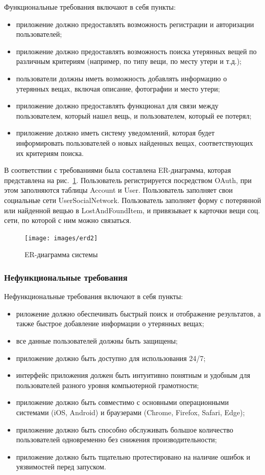 Функциональные требования включают в себя пункты:

\begin{itemize}[wide=0pt]
	\item приложение должно предоставлять возможность регистрации и авторизации пользователей;
	\item приложение должно предоставлять возможность поиска утерянных вещей по различным критериям (например, по типу вещи, по месту утери и т.д.);
	\item пользователи должны иметь возможность добавлять информацию о утерянных вещах, включая описание, фотографии и место утери;
	\item приложение должно предоставлять функционал для связи между пользователем, который нашел вещь, и пользователем, который ее потерял;
	\item приложение должно иметь систему уведомлений, которая будет информировать пользователей о новых найденных вещах, соответствующих их критериям поиска.
\end{itemize}

В соответствии с требованиями была составлена ER-диаграмма, которая представлена на рис.~\ref{fig:erd}. Пользователь регистрируется посредством OAuth, при этом заполняются таблицы Account и User. Пользователь заполняет свои социальные сети UserSocialNetwork. Пользователь заполняет форму с потерянной или найденной вещью в LostAndFoundItem, и привязывает к карточки вещи соц. сети, по которой с ним можно связаться.

\begin{figure}[htb]
	\centering
	\texttt{[image: images/erd2]}
	\parskip=6pt
	\caption{ER-диаграмма системы}
	\label{fig:erd}
\end{figure}

\subsubsection{Нефункциональные требования}

Нефункциональные требования включают в себя пункты:

\begin{itemize}[wide=0pt]
	\item риложение должно обеспечивать быстрый поиск и отображение результатов, а также быстрое добавление информации о утерянных вещах;
	\item все данные пользователей должны быть защищены;
	\item приложение должно быть доступно для использования 24/7;
	\item интерфейс приложения должен быть интуитивно понятным и удобным для пользователей разного уровня компьютерной грамотности;
	\item приложение должно быть совместимо с основными операционными системами (iOS, Android) и браузерами (Chrome, Firefox, Safari, Edge);
	\item приложение должно быть способно обслуживать большое количество пользователей одновременно без снижения производительности;
	\item приложение должно быть тщательно протестировано на наличие ошибок и уязвимостей перед запуском.
\end{itemize}

